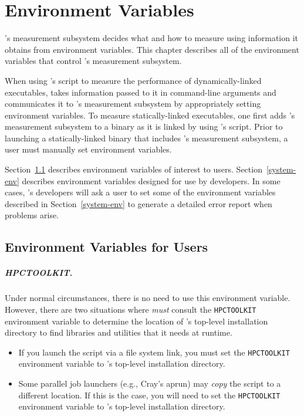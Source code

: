 \newcommand{\parg}{\vspace{1ex}\noindent}

\chapter{Environment Variables}
\label{sec:env}

\HPCToolkit{}'s measurement subsystem decides what and how to measure
using information it obtains from environment variables.
This chapter describes all of the environment variables that control
\HPCToolkit's measurement subsystem.

When using
\HPCToolkit{}'s \hpcrun{} script to measure the performance of
dynamically-linked executables, \hpcrun{} takes information passed
to it in command-line arguments and communicates it to \HPCToolkit{}'s
measurement subsystem by appropriately setting environment variables.
To measure statically-linked executables, one first adds \HPCToolkit's
measurement subsystem to a binary as it is linked by using \HPCToolkit's
\hpclink{} script. Prior to launching a statically-linked binary that
includes \HPCToolkit's measurement subsystem, a user
must manually set environment variables.

Section~\ref{user-env} describes
environment variables of interest to users. Section~\ref{system-env}
describes environment variables designed for use by \HPCToolkit{}
developers. In some cases, \HPCToolkit's developers will ask a user
to set some of the environment variables described in Section~\ref{system-env} to generate a detailed error
report when problems arise.

\section{Environment Variables for Users}
\label{user-env}

\paragraph{HPCTOOLKIT.}
Under normal circumstances, there is no need to use this environment variable.
However, there are two situations where \hpcrun{}
\emph{must} consult the \verb+HPCTOOLKIT+ environment variable to determine the location
of \HPCToolkit{}'s top-level installation directory to find libraries
and utilities that it needs at runtime.

\begin{itemize}
\item
       If you launch the \hpcrun{} script via a file system link,
       you must set the \verb+HPCTOOLKIT+ environment variable to
       \HPCToolkit{}'s top-level installation directory.
\item Some parallel job launchers (e.g., Cray's aprun) may \emph{copy} the
       \hpcrun{} script to a different location. If this is the case, you will need to set the \verb+HPCTOOLKIT+ environment variable to
       \HPCToolkit{}'s top-level installation directory.

\end{itemize}

